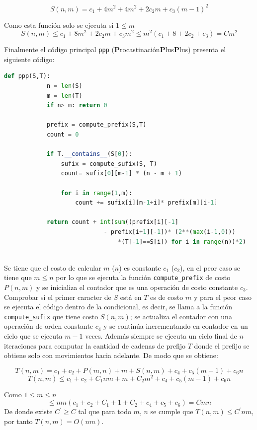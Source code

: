 \documentclass[a4paper]{article}
\begin{document}
    $$S(n,m) = c_1 + 4m^2 + 4m^2 + 2c_2m + c_3(m-1)^2$$

    Como esta funci\'on solo se ejecuta si $1\leq m$
    $$S(n,m) \leq c_1 + 8m^2 + 2c_2m + c_3m^2 \leq m^2(c_1 + 8 +2c_2 + c_3) = Cm^2$$

    Finalmente el c\'odigo principal \texttt{ppp} (\textbf{P}rocastinaci\'on\textbf{P}lus\textbf{P}lus) presenta el siguiente c\'odigo:

    \begin{lstlisting}[language=Python]
        def ppp(S,T):
            n = len(S)
            m = len(T)
            if n> m: return 0
        
            prefix = compute_prefix(S,T)
            count = 0
        
            if T.__contains__(S[0]):
                sufix = compute_sufix(S, T)
                count= sufix[0][m-1] * (n - m + 1)
                
                for i in range(1,m):           
                    count += sufix[i][m-1+i]* prefix[m][i-1]
            
            return count + int(sum((prefix[i][-1] 
                            - prefix[i+1][-1])* (2**(max(i-1,0))) 
                                *(T[-1]==S[i]) for i in range(n))*2)
    
    \end{lstlisting}
    Se tiene que el costo de calcular $m$ ($n$) es constante $c_1$ ($c_2$), en el peor caso se tiene que $m \leq n$ por 
    lo que se ejecuta la funci\'on \texttt{compute\_prefix} de costo $P(n,m)$ y se inicializa el contador que es una operaci\'on de costo constante $c_3$.
    Comprobar si el primer caracter de $S$ est\'a en $T$  es de costo  $m$ y para el peor caso se ejecuta el c\'odigo dentro de la condicional, 
    es decir, se llama a la funci\'on \texttt{compute\_sufix} que tiene costo $S(n,m)$; se actualiza el contador con una operaci\'on de orden constante $c_4$ 
    y se contin\'ua incrementando en contador en un ciclo que se ejecuta $m-1$ veces. Adem\'as siempre se ejecuta un ciclo final 
    de $n$ iteraciones para computar la cantidad de cadenas de prefijo $T$ donde el prefijo se obtiene solo con movimientos hacia adelante. De modo que se obtiene: 

    $$ T(n,m) = c_1 + c_2 + P(m,n) + m + S(n,m) + c_4 +c_5(m-1) + c_6n $$
	$$ T(n,m) \leq c_1 + c_2 + C_1nm + m + C_2m^2 + c_4 +c_5(m-1) + c_6n $$

    Como $1 \leq m\leq n$
    $$\leq mn (c_1 + c_2 + C_1 + 1 + C_2 + c_4 +c_5 + c_6) = Cmn $$
    De donde existe $C^{'} \geq C$ tal que para todo $m$, $n$ se cumple que $T(n,m) \leq C^{'}nm$,
    por tanto $T(n,m) = O(nm)$.
\end{document}
